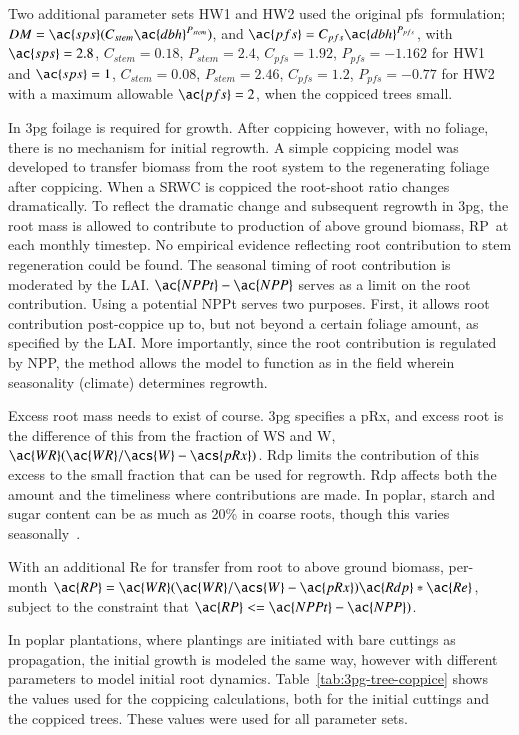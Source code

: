 \documentclass[preprint,12pt]{elsarticle}
\begin{document}
Two additional parameter sets HW1 and HW2 used the original
\ac{pfs}~formulation; $DM=\ac{sps}(C_{stem} \ac{dbh}^{P_{stem}})$, and $\ac{pfs} =
C_{pfs} \ac{dbh}^{P_{pfs}}$, with $\ac{sps}=2.8$, $C_{stem}=0.18$,
$P_{stem}=2.4$, $C_{pfs}=1.92$, $P_{pfs}=-1.162$ for HW1 and $\ac{sps}=1$,
$C_{stem}=0.08$, $P_{stem}=2.46$, $C_{pfs}=1.2$, $P_{pfs}=-0.77$ for
HW2 with a maximum allowable $\ac{pfs}=2$, when the coppiced trees small.

In \ac{3pg} foilage is required for growth.  After coppicing however,
with no foliage, there is no mechanism for initial regrowth. A simple
coppicing model was developed to transfer biomass from the root
system to the regenerating foliage after coppicing.  When a \ac{SRWC}
is coppiced the root-shoot ratio changes dramatically.  To reflect
the dramatic change and subsequent regrowth in \ac{3pg}, the root mass
is allowed to contribute to production of above ground biomass,
\ac{RP}~at each monthly timestep.  No empirical evidence reflecting
root contribution to stem regeneration could be found. The seasonal timing of root
contribution is moderated by the \ac{LAI}. $\ac{NPPt}-\ac{NPP}$ serves
as a limit on the root contribution.  Using a potential \ac{NPPt}
serves two purposes. First, it allows root contribution post-coppice up to, but
not beyond a certain foliage amount, as specified by the \ac{LAI}.
More importantly, since the root contribution is regulated by
\ac{NPP}, the method allows the model to function as in the field
wherein seasonality (climate) determines regrowth.

Excess root mass needs to exist of course.  \ac{3pg} specifies a
\ac{pRx}, and excess root is the difference of this from the fraction
of \ac{WS} and \ac{W}, $\ac{WR}(\ac{WR}/\acs{W}-\acs{pRx})$.  \ac{Rdp}
limits the contribution of this excess to the small fraction that can
be used for regrowth. \ac{Rdp} affects both the amount and the timeliness where
contributions are made.  In poplar, starch and sugar content can be as
much as 20\% in coarse roots, though this varies
seasonally~\cite{Regier2010}.

With an additional \ac{Re} for transfer from root to above ground
biomass, per-month $\ac{RP} =
\ac{WR}(\ac{WR}/\acs{W}-\ac{pRx})\ac{Rdp}*\ac{Re}$, subject to the
constraint that $\ac{RP} <= \ac{NPPt}-\ac{NPP})$.

In poplar plantations, where plantings are initiated with bare
cuttings as propagation, the initial growth is modeled the same way,
however with different parameters to model initial root dynamics.
Table~\ref{tab:3pg-tree-coppice} shows the values used for the
coppicing calculations, both for the initial cuttings and the coppiced
trees.  These values were used for all parameter sets.
\end{document}
